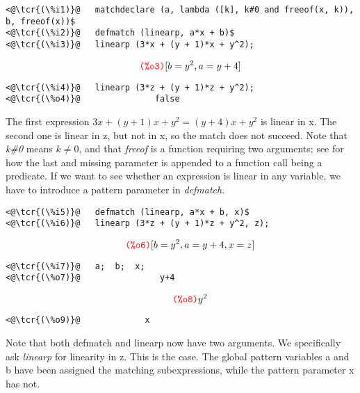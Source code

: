 \documentclass[../Maxima_Workbook.tex]{subfiles}
\begin{document}
\lz \begin{small}
\color{blue} \leqn
\begin{lstlisting}
<@\tcr{(\%i1)}@   matchdeclare (a, lambda ([k], k#0 and freeof(x, k)), b, freeof(x))$ 
<@\tcr{(\%i2)}@   defmatch (linearp, a*x + b)$
<@\tcr{(\%i3)}@   linearp (3*x + (y + 1)*x + y^2);
\end{lstlisting}
\vspace{-6mm} \[\tag*{\tcr{\ttfamily (\%o3)}} [b = y^2 , a = y + 4] \]
\vspace{-10mm} \begin{lstlisting}
<@\tcr{(\%i4)}@   linearp (3*z + (y + 1)*z + y^2);
<@\tcr{(\%o4)}@			      false
\end{lstlisting}
\color{black} \reqn
\end{small}

\lz The first expression $ 3x + (y + 1)x + y^2 = (y+4)x + y^2 $ is linear in x. The second one is linear in z, but not in x, so the match does not succeed. Note that \emph{k\#0} means $ k \neq 0 $, and that \emph{freeof} is a function requiring two arguments; see  for how the last and missing parameter is appended to a function call being a predicate. If we want to see whether an expression is linear in any variable, we have to introduce a pattern parameter in \emph{defmatch}.

\lz \begin{small}
\color{blue} \leqn
\begin{lstlisting}
<@\tcr{(\%i5)}@   defmatch (linearp, a*x + b, x)$
<@\tcr{(\%i6)}@   linearp (3*z + (y + 1)*z + y^2, z);
\end{lstlisting}
\vspace{-5mm} \[\tag*{\tcr{\ttfamily (\%o6)}} [b = y^2 , a = y + 4,x=z] \]
\vspace{-9mm} \begin{lstlisting}
<@\tcr{(\%i7)}@   a;  b;  x;
<@\tcr{(\%o7)}@			       y+4
\end{lstlisting}
\vspace{-5mm} \[\tag*{\tcr{\ttfamily (\%o8)}} y^2 \]
\vspace{-9mm} \begin{lstlisting}
<@\tcr{(\%o9)}@				x
\end{lstlisting}
\color{black} \reqn
\end{small}

\lz Note that both defmatch and linearp now have two arguments. We specifically ask \emph{linearp} for linearity in z. This is the case. The global pattern variables a and b have been assigned the matching subexpressions, while the pattern parameter x has not.
\end{document}
